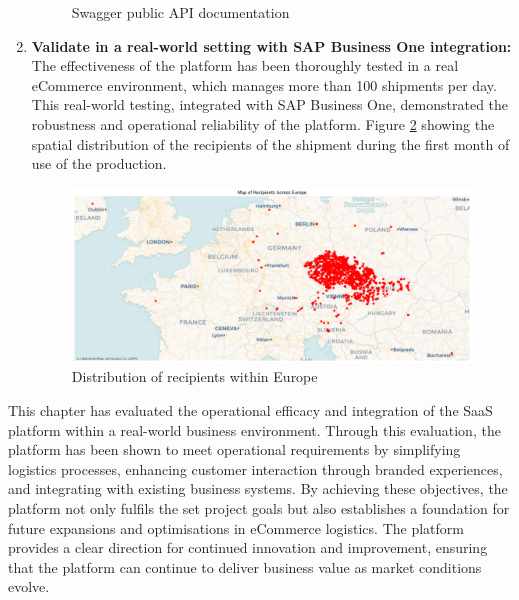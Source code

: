 \begin{enumerate}[label=\bfseries G\arabic*:,leftmargin=*]
\begin{figure}[H]
    \caption{Swagger public API documentation}
    \label{img08:fig:swagger_documentation}
    \end{figure}
    
    \item \textbf{Validate in a real-world setting with SAP Business One integration:} The effectiveness of the platform has been thoroughly tested in a real eCommerce environment, which manages more than 100 shipments per day. 
    This real-world testing, integrated with SAP Business One, demonstrated the robustness and operational reliability of the platform.
    Figure \ref{img08:plot:recipients_distribution} showing the spatial distribution of the recipients of the shipment during the first month of use of the production.
    \begin{figure}[H]\centering
    \includegraphics[width=140mm]{img/chap08/recipients_europe.png}
    \caption{Distribution of recipients within Europe}
    \label{img08:plot:recipients_distribution}
    \end{figure}
\end{enumerate}

This chapter has evaluated the operational efficacy and integration of the \ac{SaaS} platform within a real-world business environment.
Through this evaluation, the platform has been shown to meet operational requirements by simplifying logistics processes, enhancing customer interaction through branded experiences, and integrating with existing business systems. 
By achieving these objectives, the platform not only fulfils the set project goals but also establishes a foundation for future expansions and optimisations in eCommerce logistics. 
The platform provides a clear direction for continued innovation and improvement, ensuring that the platform can continue to deliver business value as market conditions evolve.


